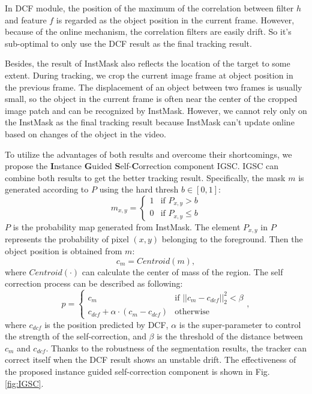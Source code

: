 \documentclass[review]{elsarticle}
\begin{document}
\begin{CJK*}{UTF8}{gbsn}
In DCF module, the position of the maximum of the correlation between filter $h$ and feature $f$ is regarded as the object position in the current frame. However, because of the online mechanism, the correlation filters are easily drift. So it's sub-optimal to only use the DCF result as the final tracking result.

Besides, the result of InstMask also reflects the location of the target to some extent. During tracking, we crop the current image frame at object position in the previous frame. The displacement of an object between two frames is usually small, so the object in the current frame is often near the center of the cropped image patch and can be recognized by InstMask. However, we cannot rely only on the InstMask as the final tracking result because InstMask can't update online based on changes of the object in the video.

To utilize the advantages of both results and overcome their shortcomings, we propose the \textbf{I}nstance \textbf{G}uided \textbf{S}elf-\textbf{C}orrection component IGSC. IGSC can combine both results to get the better tracking result. Specifically, the mask $m$ is generated according to $P$ using the hard thresh $b \in [0, 1] $:
\begin{equation}
m_{x,y} = \left\{ \begin{array}{ll}
 1 & \textrm{if $P_{x,y} > b$}\\
 0 & \textrm{if $P_{x,y} \le b$}
 \end{array} \right.
\end{equation}
$P$ is the probability map generated from InstMask. The element $P_{x,y}$ in $P$ represents the probability of pixel $(x,y)$ belonging to the foreground.
Then the object position is obtained from $m$:
\begin{equation}
c_{m} = Centroid(m),
\end{equation}
where $Centroid(\mathord{\cdot})$ can calculate the center of mass of the region. The self correction process can be described as following:
\begin{equation}
p = \left\{ \begin{array}{ll}
 c_{m} & \textrm{if $||c_{m}-c_{dcf}||_2^2 < \beta$}\\
 c_{dcf} + \alpha \cdot (c_{m}-c_{dcf}) & \textrm{otherwise}
 \end{array} \right.,
\end{equation}
where $c_{dcf}$ is the position predicted by DCF, $\alpha$ is the super-parameter to control the strength of the self-correction, and  $\beta$ is the threshold of the distance between $c_{m}$ and $c_{dcf}$.
Thanks to the robustness of the segmentation results, the tracker can correct itself when the DCF result shows an unstable drift. The effectiveness of the proposed instance guided self-correction component is shown in Fig. \ref{fig:IGSC}.


\end{CJK*}
\end{document}
